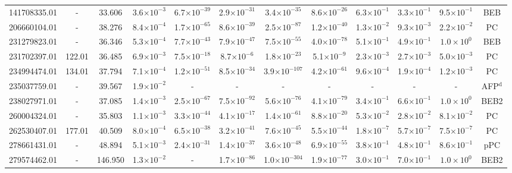 \begin{landscape}
\begin{table*}
\begin{tabular}{cc|cc|cccccccc}
    141708335.01 & - & 33.606 & 3.6$\times 10^{-3}$ & 6.7$\times 10^{-39}$ & 2.9$\times 10^{-31}$ & 3.4$\times 10^{-35}$ & 8.6$\times 10^{-26}$ & 6.3$\times 10^{-1}$ & 3.3$\times 10^{-1}$ & 9.5$\times 10^{-1}$ & BEB \\ 
    206660104.01 & - & 38.276 & 8.4$\times 10^{-4}$ & 1.7$\times 10^{-65}$ & 8.6$\times 10^{-39}$ & 2.5$\times 10^{-87}$ & 1.2$\times 10^{-40}$ & 1.3$\times 10^{-2}$ & 9.3$\times 10^{-3}$ & 2.2$\times 10^{-2}$ & PC \\ 
    231279823.01 & - & 36.346 & 5.3$\times 10^{-4}$ & 7.7$\times 10^{-43}$ & 7.9$\times 10^{-47}$ & 7.5$\times 10^{-55}$ & 4.0$\times 10^{-78}$ & 5.1$\times 10^{-1}$ & 4.9$\times 10^{-1}$ & $1.0\times 10^{0}$ & BEB \\ 
    231702397.01 & 122.01 & 36.485 & 6.9$\times 10^{-3}$ & 7.5$\times 10^{-18}$ & 8.7$\times 10^{-6}$ & 1.8$\times 10^{-23}$ & 5.1$\times 10^{-9}$ & 2.3$\times 10^{-3}$ & 2.7$\times 10^{-3}$ & 5.0$\times 10^{-3}$ & PC \\ 
    234994474.01 & 134.01 & 37.794 & 7.1$\times 10^{-4}$ & 1.2$\times 10^{-51}$ & 8.5$\times 10^{-34}$ & 3.9$\times 10^{-107}$ & 4.2$\times 10^{-61}$ & 9.6$\times 10^{-4}$ & 1.9$\times 10^{-4}$ & 1.2$\times 10^{-3}$ & PC \\ 
    235037759.01 & - & 39.567 & 1.9$\times 10^{-2}$ & - & - & - & - & - & - & - & AFP$^{\text{d}}$ \\ 
    238027971.01 & - & 37.085 & 1.4$\times 10^{-3}$ & 2.5$\times 10^{-67}$ & 7.5$\times 10^{-92}$ & 5.6$\times 10^{-76}$ & 4.1$\times 10^{-79}$ & 3.4$\times 10^{-1}$ & 6.6$\times 10^{-1}$ & $1.0\times 10^{0}$ & BEB2 \\ 
    260004324.01 & - & 35.803 & 1.1$\times 10^{-3}$ & 3.3$\times 10^{-44}$ & 4.1$\times 10^{-17}$ & 1.4$\times 10^{-61}$ & 8.8$\times 10^{-20}$ & 5.3$\times 10^{-2}$ & 2.8$\times 10^{-2}$ & 8.1$\times 10^{-2}$ & PC \\ 
    262530407.01 & 177.01 & 40.509 & 8.0$\times 10^{-4}$ & 6.5$\times 10^{-38}$ & 3.2$\times 10^{-41}$ & 7.6$\times 10^{-45}$ & 5.5$\times 10^{-44}$ & 1.8$\times 10^{-7}$ & 5.7$\times 10^{-7}$ & 7.5$\times 10^{-7}$ & PC \\ 
    278661431.01 & - & 48.894 & 5.1$\times 10^{-3}$ & 2.4$\times 10^{-31}$ & 1.4$\times 10^{-37}$ & 3.6$\times 10^{-48}$ & 6.9$\times 10^{-55}$ & 3.8$\times 10^{-1}$ & 4.8$\times 10^{-1}$ & 8.6$\times 10^{-1}$ & pPC \\ 
    279574462.01 & - & 146.950 & 1.3$\times 10^{-2}$ & - & 1.7$\times 10^{-86}$ & 1.0$\times 10^{-304}$ & 1.9$\times 10^{-77}$ & 3.0$\times 10^{-1}$ & 7.0$\times 10^{-1}$ & $1.0\times 10^{0}$ & BEB2 \\ 

\end{tabular}
\end{table*}
\end{landscape}
